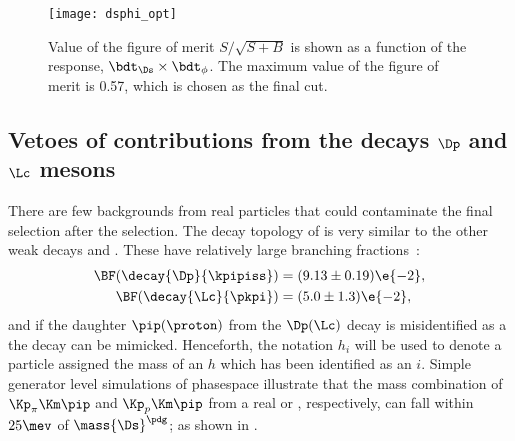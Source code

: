 \begin{figure}
  \begin{center}
    \texttt{[image: dsphi\_opt]}
    \caption[Optimization of BDT cut for selection of \btodsphi candidates]
    {
      Value of the figure of merit $S/\sqrt{S+B}$ is shown as a function of the \bdt response,
      $\bdt_{\Ds}\times\bdt_{\phi}$.
      The maximum value of the figure of merit is 0.57, which is chosen as the final \bdt cut.
    }
    \label{fig:dsphi:opt}
  \end{center}
\end{figure}





\subsection[Vetoes of contributions from the decaying {\Dp} and {\Lc} mesons]
{Vetoes of contributions from the decays $\boldsymbol{\Dp}$ and $\boldsymbol{\Lc}$ mesons}
There are few backgrounds from real particles that could contaminate the final selection after the
\bdt selection.
The decay topology of \dstokkpi is very similar to the other weak decays \decay{\Dp}{\kpipiss} and
\decay{\Lc}{\pkpi}.
These have relatively large branching fractions~\cite{PDG2012}:
\begin{align}
  \BF(\decay{\Dp}{\kpipiss}) &= (9.13\pm0.19)\e{-2}, \nonumber\\
  \BF(\decay{\Lc}{\pkpi}) &= (5.0\pm1.3)\e{-2},\nonumber
\end{align}
and if the daughter $\pip(\proton)$ from the $\Dp(\Lc)$ decay is misidentified as a \Kp the decay
\dstokkpi can be mimicked.
Henceforth, the notation $h_i$ will be used to denote a particle assigned the mass of an $h$ which
has been identified as an $i$.
Simple generator level simulations of phasespace illustrate that
the mass combination of $\Kp_\pi\Km\pip$ and $\Kp_p\Km\pip$ from a real \Dp or \Lc, respectively,
can fall within $25\mev$ of $\mass{\Ds}^\pdg$; as shown in .


